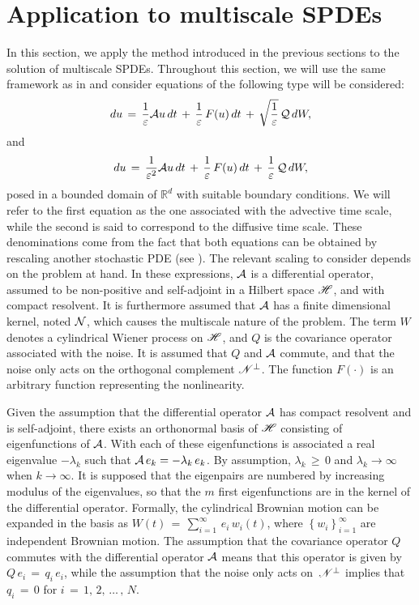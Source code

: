 \section{Application to multiscale SPDEs}
\label{sec:application_to_multiscale_spdes}

In this section, we apply the method introduced in the previous sections to
the solution of multiscale SPDEs. Throughout this section, we will use the same
framework as in \cite{abdulle2012numerical} and consider equations of the
following type will be considered:
\begin{equation}
    du\,=\, \frac{1}{\varepsilon}  \mathcal A u \,dt \,+\, \frac 1 \varepsilon \, F(u) \, dt\, +
    \, \sqrt{\frac{1}\varepsilon}\,\mathcal Q\,dW, 
    \label{eq: basis spde} 
\end{equation}
and
\begin{equation}
    du\,=\, \frac{1}{\varepsilon^2}  \mathcal A u \,dt \,+\, \frac 1 \varepsilon \, F(u) \, dt\, +
    \,\frac{1}\varepsilon\,\mathcal Q\,dW, 
    \label{eq: basis spde} 
\end{equation}
posed in a bounded domain of $\mathbb R^d$ with suitable boundary conditions.
We will refer to the first equation as the one associated with the advective
time scale, while the second is said to correspond to the diffusive time scale.
These denominations come from the fact that both equations can be obtained by
rescaling another stochastic PDE (see  \cite{abdulle2012numerical}). The
relevant scaling to consider depends on the problem at hand.  In
these expressions, $\mathcal A$ is a differential operator, assumed to be
non-positive and self-adjoint in a Hilbert space $\mathscr H$, and with compact
resolvent. It is furthermore assumed that $\mathcal A$ has a finite dimensional
kernel, noted $\mathcal N$, which causes the multiscale nature of the problem.
The term $W$ denotes a cylindrical Wiener process on $\mathscr H$, and $Q$ is
the covariance operator associated with the noise. It is assumed that $Q$ and
$\mathcal A$ commute, and that the noise only acts on the orthogonal complement
$\mathscr N^{\perp}$.  The function $F({\cdot})$ is an arbitrary function representing the
nonlinearity. 

Given the assumption that the differential operator $\mathcal A$ has compact
resolvent and is self-adjoint, there exists an orthonormal basis of $\mathscr
H$ consisting of eigenfunctions of $\mathcal A$. With each of these
eigenfunctions is associated a real eigenvalue $-{\lambda}_k$ such that $\mathcal
A\,e_{k} = -{\lambda}_{k}\,e_{k}$. By assumption, $\lambda_k\,\geq\,0$ and
$\lambda_k \to \infty$ when $k\to \infty$.  It is supposed that the eigenpairs
are numbered by increasing modulus of the eigenvalues, so that the $m$ first
eigenfunctions are in the kernel of the differential operator. Formally,
the cylindrical Brownian motion can be expanded in the basis as $W(t) \,=\,
\sum^{\infty}_{i=1} \, e_i \, w_i(t)$, where $\left\{w_i\right\}_{i=1}^{\infty}$ are independent
Brownian motion. The assumption that the covariance operator $Q$ commutes with
the differential operator $\mathcal A$ means that this operator is given by
$Q\,e_i \,=\, q_i\, e_i$, while the assumption that the noise only acts on
\,$\mathscr N^{\perp}$ implies that $q_i \,=\, 0$ for $i\,=\,1,\,2,\,{\dots}\, , \, N$.

